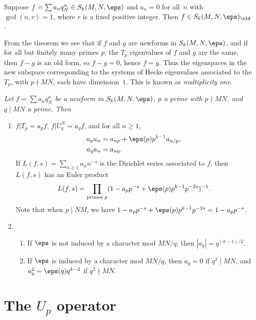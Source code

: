 \documentclass{report}
\begin{document}
\begin{theorem}
Suppose $f = \sum a_n q_N^n \in S_k(M,N,\eps)$ and $a_n=0$ for all~$n$ with
$\gcd(n,r)=1$, where $r$ is a fixed positive integer.  Then
$f \in S_k(M,N,\eps)_{\old}$.
\end{theorem}
From the theorem we see that if $f$ and $g$ are newforms in
$S_k(M,N,\eps)$, and if for all but finitely many primes $p$, the
$T_p$ eigenvalues of $f$ and $g$ are the same, then $f-g$ is an old
form, so $f-g=0$, hence $f=g$.  Thus the eigenspaces in the new
subspace corresponding to the systems of Hecke eigenvalues associated
to the $T_p$, with $p\nmid MN$, each have dimension~$1$.  This is
known as {\em multiplicity one}.

\begin{theorem}{\em
Let $f = \sum a_n q_N^n$ be a newform in $S_k(M,N,\eps)$, $p$ a
prime with $p\nmid MN$, and $q\mid MN$ a prime.  Then
\begin{enumerate}
\item $f | T_p = a_p f$,  $f|U_q^N = a_q f$, and for all $n\geq 1$,
\begin{align*}
  a_p a_n &= a_{np} + \eps(p)p^{k-1} a_{n/p},\\
  a_q a_n &= a_{nq}.
\end{align*}
If $L(f,s) = \sum_{n\geq 1} a_n n^{-s}$ is the Dirichlet series associated
to $f$, then $L(f,s)$ has an Euler product
\[
  L(f,s) =
  \prod_{\text{primes }p} (1-a_p p^{-s} + \eps(p) p^{k-1}p^{-2s})^{-1}.
\]
Note that when $p\mid NM$, we have
$1-a_p p^{-s} + \eps(p) p^{k-1}p^{-2s} = 1-a_p p^{-s}$.

\item
\begin{enumerate}
\item If $\eps$ is not induced by a character mod $MN/q$, then $|a_q| = q^{(k-1)/2}$.

\item If $\eps$ is induced by a character mod $MN/q$, then $a_q = 0$ if $q^2\mid MN$, and
$a_q^2 = \eps(q) q^{k-2}$ if $q^2\nmid MN$.
\end{enumerate}
\end{enumerate}}
\end{theorem}







\section{The $U_p$ operator}\label{sec:up_explicit}
\end{document}
